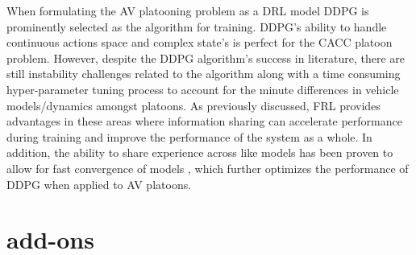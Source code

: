 When formulating the AV platooning problem as a DRL model DDPG is prominently selected 
as the algorithm for training.  DDPG's ability to handle continuous actions space and 
complex state's is perfect for the CACC platoon problem.  However, despite the DDPG 
algorithm's success in literature, there are still instability challenges related to 
the algorithm along with a time consuming hyper-parameter tuning process to account 
for the minute differences in vehicle models/dynamics amongst platoons. As previously 
discussed, FRL provides advantages in these areas where information sharing can accelerate 
performance during training and improve the performance of the system as a whole. In 
addition, the ability to share experience across like models has been proven to allow 
for fast convergence of models \cite{Lim2020}, which further optimizes the performance 
of DDPG when applied to AV platoons.

\section{add-ons}


\cite{Schwarting2018}
\cite{Shwartz2018}
\cite{Hussain2019}
\cite{Vinitsky2018}
\cite{Kiran2020}
\cite{Li2019}
\cite{Kendall2019}
\cite{Yuan2019}
\cite{zhangYuxiang2020}
